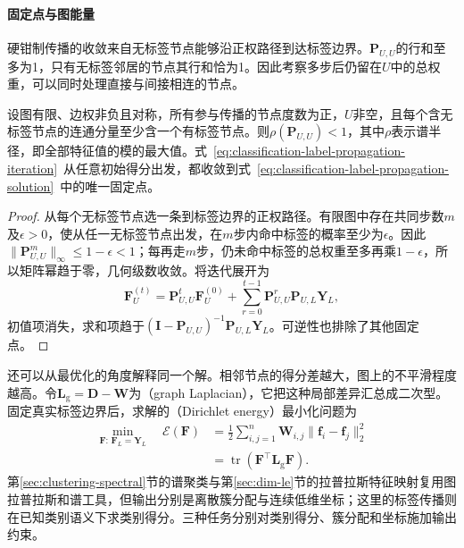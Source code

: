 \paragraph{固定点与图能量}
\label{sec:classification-label-propagation-analysis}
硬钳制传播的收敛来自无标签节点能够沿正权路径到达标签边界。$\bm{P}_{U,U}$的行和至多为1，只有无标签邻居的节点其行和恰为1。因此考察多步后仍留在$U$中的总权重，可以同时处理直接与间接相连的节点。

\begin{theorem}[标签传播在各连通分量有标签条件下解的唯一性]
  \label{thm:classification-label-propagation-convergence}
  设图有限、边权非负且对称，所有参与传播的节点度数为正，$U$非空，且每个含无标签节点的连通分量至少含一个有标签节点。则$\rho(\bm{P}_{U,U})<1$，其中$\rho$表示谱半径，即全部特征值的模的最大值。式~\eqref{eq:classification-label-propagation-iteration}~从任意初始得分出发，都收敛到式~\eqref{eq:classification-label-propagation-solution}~中的唯一固定点。
\end{theorem}

\begin{proof}
从每个无标签节点选一条到标签边界的正权路径。有限图中存在共同步数$m$及$\epsilon>0$，使从任一无标签节点出发，在$m$步内命中标签的概率至少为$\epsilon$。因此$\|\bm P_{U,U}^{m}\|_\infty\leq1-\epsilon<1$；每再走$m$步，仍未命中标签的总权重至多再乘$1-\epsilon$，所以矩阵幂趋于零，几何级数收敛。将迭代展开为
\[
  \bm F_U^{(t)}=\bm P_{U,U}^{t}\bm F_U^{(0)}
    +\sum_{r=0}^{t-1}\bm P_{U,U}^{r}\bm P_{U,L}\bm Y_L,
\]
初值项消失，求和项趋于$(\bm I-\bm P_{U,U})^{-1}\bm P_{U,L}\bm Y_L$。可逆性也排除了其他固定点。
\end{proof}

还可以从最优化的角度解释同一个解。相邻节点的得分差越大，图上的不平滑程度越高。令$\bm{L}_{\mathrm{g}}=\bm{D}-\bm{W}$为（graph Laplacian），它把这种局部差异汇总成二次型。固定真实标签边界后，求解的（Dirichlet energy）最小化问题为
\begin{equation}
  \label{eq:classification-label-propagation-energy}
  \begin{aligned}
    \min_{\bm{F}:\,\bm{F}_L=\bm{Y}_L}\quad
    \mathcal{E}(\bm{F})
      &=\frac12\sum_{i,j=1}^{n}
        \bm{W}_{i,j}\lVert\bm{f}_i-\bm{f}_j\rVert_2^2\\
      &=\operatorname{tr}
        (\bm{F}^{\top}\bm{L}_{\mathrm{g}}\bm{F}).
  \end{aligned}
\end{equation}
第\ref{sec:clustering-spectral}节的谱聚类与第\ref{sec:dim-le}节的拉普拉斯特征映射复用图拉普拉斯和谱工具，但输出分别是离散簇分配与连续低维坐标；这里的标签传播则在已知类别语义下求类别得分。三种任务分别对类别得分、簇分配和坐标施加输出约束。

